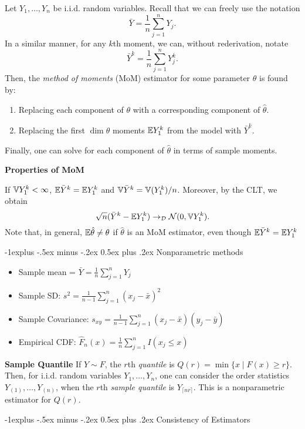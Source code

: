 \documentclass[10pt,landscape]{article}
\makeatletter
\renewcommand{\subsection}{\@startsection{subsection}{2}{0mm}%
                                {-1explus -.5ex minus -.2ex}%
                                {0.5ex plus .2ex}%
                                {\normalfont\normalsize\bfseries}}
\makeatother
\begin{document}
\begin{multicols*}{3}
Let $Y_1,\dots,Y_n$ be i.i.d. random variables. Recall that we can freely use the notation $$\bar{Y}=\frac{1}{n}\sum_{j=1}^n Y_j.$$ In a similar manner, for any $k$th moment, we can, without rederivation, notate $$\bar{Y}^k=\frac{1}{n}\sum_{j=1}^n Y_j^k.$$ Then, the \emph{method of moments} (MoM) estimator for some parameter $\theta$ is found by:
\begin{enumerate}
    \item Replacing each component of $\theta$ with a corresponding component of $\hat{\theta}$.
    \item Replacing the first $\dim \theta$ moments $\mathbb{E} Y_1^k$ from the model with $\bar{Y}^k$.
\end{enumerate}
Finally, one can solve for each component of $\hat{\theta}$ in terms of sample moments.

\textbf{Properties of MoM}

If $\mathbb{V} Y_1^k<\infty$, $\mathbb{E} \bar{Y}^k=\mathbb{E} Y_1^k$ and $\mathbb{V} \bar{Y}^k=\mathbb{V}(Y_1^k)/n$. Moreover, by the CLT, we obtain $$\sqrt{n}(\bar{Y}^k - \mathbb{E} Y_1^k)\to_\mathcal{D} \mathcal{N}(0,\mathbb{V} Y_1^k).$$ Note that, in general, $\mathbb{E} \hat{\theta}\neq \theta$ if $\hat{\theta}$ is an MoM estimator, even though $\mathbb{E} \bar{Y}^k=\mathbb{E} Y_1^k$

\subsection{Nonparametric methods}
\begin{itemize}

\item Sample mean = $\bar{Y}=\frac{1}{n}\sum_{j=1}^n Y_j$
\item Sample SD: $s^2=\frac{1}{n-1} \sum_{j=1}^n\left(x_j-\bar{x}\right)^2$
\item Sample Covariance: $s_{x y}=\frac{1}{n-1} \sum_{j=1}^n\left(x_j-\bar{x}\right)\left(y_j-\bar{y}\right)$
\item Empirical CDF: $\hat{F}_n(x)=\frac{1}{n} \sum_{j=1}^n I\left(x_j \leq x\right)$
 
\end{itemize}
\textbf{Sample Quantile}
If $Y\sim F$, the $r$th \emph{quantile} is $Q(r)=\min\{ x\mid F(x)\geq r\}$. Then, for i.i.d. random variables $Y_1,\dots,Y_n$, one can consider the order statistics $Y_{(1)},\dots,Y_{(n)}$, when the $r$th \emph{sample quantile} is $Y_{\lceil nr \rceil}$. This is a nonparametric estimator for $Q(r)$.

\subsection{Consistency of Estimators}


\end{multicols*}
\end{document}
